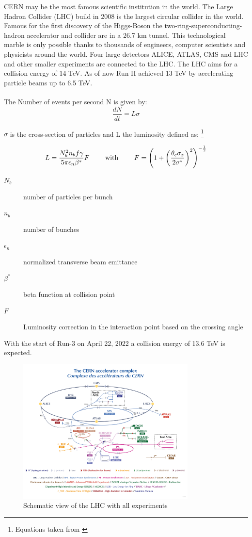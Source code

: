 \documentclass[../Bachelorarbeit.tex]{subfiles}
\begin{document}
CERN may be the most famous scientific institution in the world. The Large Hadron Collider (LHC)\cite{Evans.2008} build in 2008 is the largest circular collider in the world.
Famous for the first discovery of the Higgs-Boson the two-ring-superconducting- hadron accelerator and collider are in a 26.7 km tunnel.
This technological marble is only possible thanks to thousands of engineers, computer scientists and physicists around the world.
Four large detectors ALICE, ATLAS, CMS and LHC and other smaller experiments are connected to the LHC.
The LHC aims for a collision energy of 14 TeV. As of now Run-II achieved 13 TeV by accelerating particle beams up to 6.5 TeV.\\\\
The Number of events per second N is given by:
\begin{equation}
    \frac{dN}{dt} = L \sigma
\end{equation}

$\sigma$ is the cross-section of particles and L the luminosity defined as:
\footnote{Equations taken from \cite{Evans.2008}}

\begin{equation}
    L= \frac{N_{b}^{2} n_{b} f \gamma}{5 \pi \epsilon_{n} \beta^{*}} F \qquad \textnormal{ with } \qquad  F=\left( 1 + \left( \frac{\theta_{c} \sigma_{z}}{2 \sigma^{*}}\right)^{2} \right)^{-\frac{1}{2}}
\end{equation}

\begin{description}
    \item[$N_{b}$] number of particles per bunch
    \item[$n_{b}$]  number of bunches
    \item[$\epsilon_{n}$]  normalized transverse beam emittance
    \item[$\beta^{*}$] beta function at collision point
    \item[$F$] Luminosity correction in the interaction point based on the crossing angle
\end{description}
With the start of Run-3 on April 22, 2022 a collision energy of 13.6 TeV is expected.
\begin{figure}
    \centering
    \includegraphics[width=0.8\textwidth]{images/CCC-v2022.jpg}
    \caption{Schematic view of the LHC with all experiments \cite{CERN.01.05.2022}}
    \label{fig:LHC_schematic}
\end{figure}
\end{document}
